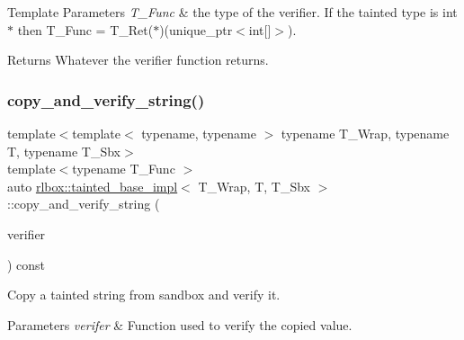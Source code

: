 \begin{DoxyTemplParams}{Template Parameters}
{\em T\+\_\+\+Func} & the type of the verifier. If the tainted type is {\ttfamily int$\ast$} then {\ttfamily T\+\_\+\+Func = T\+\_\+\+Ret($\ast$)(unique\+\_\+ptr$<$int\mbox{[}\mbox{]}$>$)}. \\
\hline
\end{DoxyTemplParams}
\begin{DoxyReturn}{Returns}
Whatever the verifier function returns. 
\end{DoxyReturn}
\mbox{\label{classrlbox_1_1tainted__base__impl_aa377cc4d0ea6768ada5032234ac89aab}} 
\subsubsection{\texorpdfstring{copy\+\_\+and\+\_\+verify\+\_\+string()}{copy\_and\_verify\_string()}}
{\footnotesize\ttfamily template$<$template$<$ typename, typename $>$ typename T\+\_\+\+Wrap, typename T, typename T\+\_\+\+Sbx$>$ \\
template$<$typename T\+\_\+\+Func $>$ \\
auto \hyperlink{classrlbox_1_1tainted__base__impl}{rlbox\+::tainted\+\_\+base\+\_\+impl}$<$ T\+\_\+\+Wrap, T, T\+\_\+\+Sbx $>$\+::copy\+\_\+and\+\_\+verify\+\_\+string (\begin{DoxyParamCaption}\item[{T\+\_\+\+Func}]{verifier }\end{DoxyParamCaption}) const\hspace{0.3cm}{\ttfamily [inline]}}



Copy a tainted string from sandbox and verify it. 


\begin{DoxyParams}{Parameters}
{\em verifer} & Function used to verify the copied value. \\
\hline
\end{DoxyParams}

